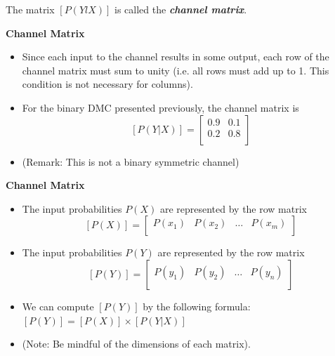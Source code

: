 \documentclass[a4]{beamer}
\begin{document}
The matrix $[P(YlX)]$ is called the \textbf{\emph{channel matrix}}.
 


\noindent \textbf{Channel Matrix}
\begin{itemize}
\item Since each input to the channel results in some
output, each row of the channel matrix must sum to unity (i.e. all rows must add up to 1. This condition is not necessary for columns).
\item For the binary DMC presented previously, the channel matrix is
\[  [P(Y|X)]  = \left[ \begin{array}{cc}
0.9 & 0.1  \\
0.2 & 0.8 \\
\end{array} \right] \]
\item (Remark: This is not a binary symmetric channel)
\end{itemize}




\noindent \textbf{Channel Matrix}
\begin{itemize}
\item The input probabilities $P(X)$ are represented by the row matrix
\[  [P(X)]  = \left[ \begin{array}{cccc}
P(x_1) & P(x_2) & \ldots & P(x_m) \\
\end{array} \right] \]
\item The input probabilities $P(Y)$ are represented by the row matrix
\[  [P(Y)]  = \left[ \begin{array}{cccc}
P(y_1) & P(y_2) & \ldots & P(y_n) \\
\end{array} \right] \]
\item We can compute $[P(Y)] $ by the following formula: $[P(Y)]  = [P(X)]\times [P(Y|X)]$
\item (Note: Be mindful of the dimensions of each matrix).
\end{itemize}
\end{document}
